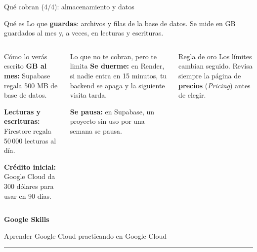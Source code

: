 \documentclass[aspectratio=169,10pt,c]{beamer}
\begin{document}
\begin{frame}{Qué cobran (4/4): almacenamiento y datos}
\begin{block}{Qué es}
\small Lo que \textbf{guardas}: archivos y filas de la base de datos. Se mide en GB guardados al mes y, a veces, en lecturas y escrituras.
\end{block}
\begin{columns}[T,onlytextwidth]
\begin{exampleblock}{Cómo lo verás escrito}
\small
\textbf{GB al mes:} Supabase regala 500 MB de base de datos.\par\smallskip
\textbf{Lecturas y escrituras:} Firestore regala 50\,000 lecturas al día.\par\smallskip
\textbf{Crédito inicial:} Google Cloud da 300 dólares para usar en 90 días.
\end{exampleblock}
\begin{alertblock}{Lo que no te cobran, pero te limita}
\small
\textbf{Se duerme:} en Render, si nadie entra en 15 minutos, tu backend se apaga y la siguiente visita tarda.\par\smallskip
\textbf{Se pausa:} en Supabase, un proyecto sin uso por una semana se pausa.
\end{alertblock}
\begin{block}{Regla de oro}
\small Los límites cambian seguido. Revisa siempre la página de \textbf{precios} (\emph{Pricing}) antes de elegir.
\end{block}
\end{columns}
\end{frame}

\begin{frame}[plain]
\vfill
\begin{center}
{\fontsize{29}{34}\selectfont\bfseries Google Skills}\par
\vspace{2mm}
{\small Aprender Google Cloud practicando en Google Cloud}\par
\vspace{4mm}
{\color{utpRojo}\rule{8.5cm}{1.2pt}}
\end{center}
\vfill
\end{frame}
\end{document}
